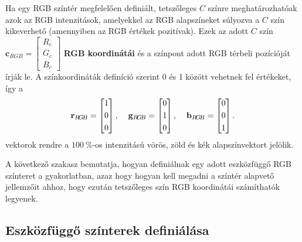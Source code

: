 \vspace{3mm}
Ha egy RGB színtér megfelelően definiált, tetszőleges $C$ színre meghatározhatóak azok az RGB intenzitások, amelyekkel az RGB alapszíneket súlyozva a $C$ szín kikeverhető (amennyiben az RGB értékek pozitívak).
Ezek az adott $C$ szín $\mathbf{c}_{RGB} = \begin{bmatrix}
       R_c \\[0.3em] G_c \\[0.3em] B_c \end{bmatrix}$ \textbf{RGB koordinátái} és a színpont adott RGB térbeli pozícióját írják le.
A színkoordináták definíció szerint 0 és 1 között vehetnek fel értékeket, így a
\begin{equation}
\mathbf{r}_{R\!G\!B} = \begin{bmatrix}
       1 \\[0.3em]
       0 \\[0.3em]
       0 \end{bmatrix}, \hspace{4mm}
\mathbf{g}_{R\!G\!B} = \begin{bmatrix}
       0 \\[0.3em]
       1 \\[0.3em]
       0 \end{bmatrix}, \hspace{4mm}
\mathbf{b}_{R\!G\!B} = \begin{bmatrix}
       0 \\[0.3em]
       0 \\[0.3em]
       1 \end{bmatrix}.
\end{equation}
vektorok rendre a $100~\%$-os intenzitású vörös, zöld és kék alapszínvektort jelölik.

A következő szakasz bemutatja, hogyan definiálnak egy adott eszközfüggő RGB színteret a gyakorlatban, azaz hogy hogyan kell megadni a színtér alapvető jellemzőit ahhoz, hogy ezután tetszőleges szín RGB koordinátái számíthatók legyenek.

\subsection{Eszközfüggő színterek definiálása}

